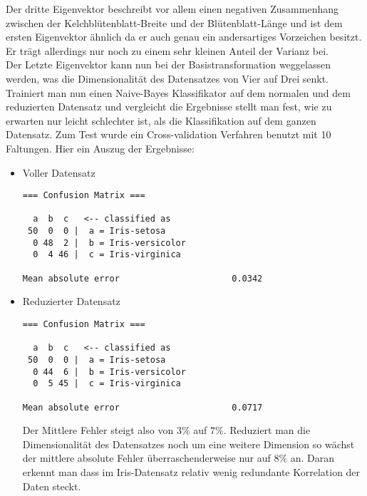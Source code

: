 \documentclass[a4paper]{article}
\begin{document}
Der dritte Eigenvektor beschreibt vor allem einen negativen Zusammenhang zwischen der Kelchblütenblatt-Breite und der Blütenblatt-Länge und ist dem ersten Eigenvektor ähnlich da er auch genau ein andersartiges Vorzeichen besitzt. Er trägt allerdings nur noch zu einem sehr kleinen Anteil der Varianz bei.\\
Der Letzte Eigenvektor kann nun bei der Basistransformation weggelassen werden, was die Dimensionalität des Datensatzes von Vier auf Drei senkt.\\
Trainiert man nun einen Naive-Bayes Klassifikator auf dem normalen und dem reduzierten Datensatz und vergleicht die Ergebnisse stellt man fest, wie zu erwarten nur leicht schlechter ist, als die Klassifikation auf dem ganzen Datensatz. Zum Test wurde ein Cross-validation Verfahren benutzt mit 10 Faltungen. Hier ein Auszug der Ergebnisse:
\begin{itemize}
\item Voller Datensatz
\begin{lstlisting}
=== Confusion Matrix ===

  a  b  c   <-- classified as
 50  0  0 |  a = Iris-setosa
  0 48  2 |  b = Iris-versicolor
  0  4 46 |  c = Iris-virginica
  
Mean absolute error                      0.0342
\end{lstlisting}
\item Reduzierter Datensatz
\begin{lstlisting}
=== Confusion Matrix ===

  a  b  c   <-- classified as
 50  0  0 |  a = Iris-setosa
  0 44  6 |  b = Iris-versicolor
  0  5 45 |  c = Iris-virginica
  
Mean absolute error                      0.0717
\end{lstlisting}
Der Mittlere Fehler steigt also von $3\%$ auf $7\%$. Reduziert man die Dimensionalität des Datensatzes noch um eine weitere Dimension so wächst der mittlere absolute Fehler überraschenderweise nur auf $8\%$ an. Daran erkennt man dass im Iris-Datensatz relativ wenig redundante Korrelation der Daten steckt.
\end{itemize}
\end{document}
